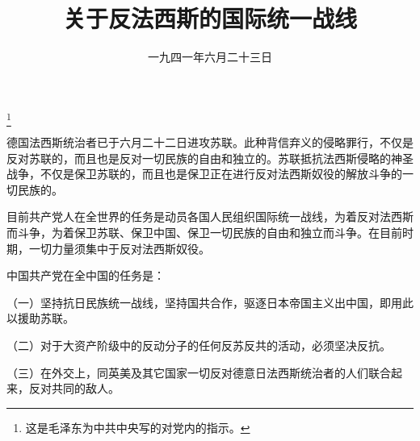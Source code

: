 
\title{关于反法西斯的国际统一战线}
\date{一九四一年六月二十三日}
\thanks{这是毛泽东为中共中央写的对党内的指示。}
\maketitle


德国法西斯统治者已于六月二十二日进攻苏联。此种背信弃义的侵略罪行，不仅是反对苏联的，而且也是反对一切民族的自由和独立的。苏联抵抗法西斯侵略的神圣战争，不仅是保卫苏联的，而且也是保卫正在进行反对法西斯奴役的解放斗争的一切民族的。

目前共产党人在全世界的任务是动员各国人民组织国际统一战线，为着反对法西斯而斗争，为着保卫苏联、保卫中国、保卫一切民族的自由和独立而斗争。在目前时期，一切力量须集中于反对法西斯奴役。

中国共产党在全中国的任务是：

（一）坚持抗日民族统一战线，坚持国共合作，驱逐日本帝国主义出中国，即用此以援助苏联。

（二）对于大资产阶级中的反动分子的任何反苏反共的活动，必须坚决反抗。

（三）在外交上，同英美及其它国家一切反对德意日法西斯统治者的人们联合起来，反对共同的敌人。
